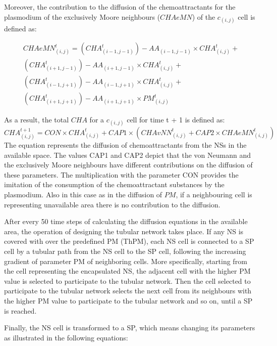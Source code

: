 Moreover, the contribution to the diffusion of the chemoattractants for the plasmodium of the exclusively Moore neighbours ($CHAeMN$) of the $c_{(i,j)}$ cell is defined as:

\begin{equation}
\begin{split}
CHAeMN^t_{(i, j)} = 
(CHA^t_{(i-1, j-1)}) - AA_{(i-1, j-1)} \times CHA^t_{(i, j)} +
\\(CHA^t_{(i+1, j-1)}) - AA_{(i+1, j-1)} \times CHA^t_{(i, j)} +
\\(CHA^t_{(i-1, j+1)}) - AA_{(i-1, j+1)} \times CHA^t_{(i, j)}  +
\\(CHA^t_{(i+1, j+1)}) - AA_{(i+1, j+1)} \times PM^t_{(i, j)}
\end{split}
\end{equation}

As a result, the total $CHA$ for a $c_{(i,j)}$ cell for time t + 1 is defined as:
\begin{equation}
CHA^{t+1}_{(i, j)} = CON \times {CHA^t_{(i, j)} + CAP1 \times (CHAvNN^t_{(i, j)} + CAP2 \times CHAeMN^t_{(i, j)})}
\end{equation}
The equation represents the diffusion of chemoattractants from the NSs in the available space. The values CAP1 and CAP2 depict that the von Neumann and the exclusively Moore neighbours have different contributions on the diffusion of these parameters. The multiplication with the parameter CON provides the imitation of the consumption of the chemoattractant substances by the plasmodium. Also in this case as in the diffusion of $PM$, if a neighbouring cell is representing unavailable area there is no contribution to the diffusion.

\par
After every 50 time steps of calculating the diffusion equations in the available area, the operation of designing the tubular network takes place. If any NS is covered with over the predefined PM (ThPM), each NS cell is connected to a SP cell by a tubular path from the NS cell to the SP cell, following the increasing gradient of parameter PM of neighboring cells. 
More specifically, starting from the cell representing the encapsulated NS, the adjacent cell with the higher PM value is selected to participate to the tubular network. Then the cell selected to participate to the tubular network selects the next cell from its neighbours with the higher PM value to participate to the tubular network and so on, until a SP is reached.

\par
Finally, the NS cell is transformed to a SP, which means changing its parameters as illustrated in the following equations:

